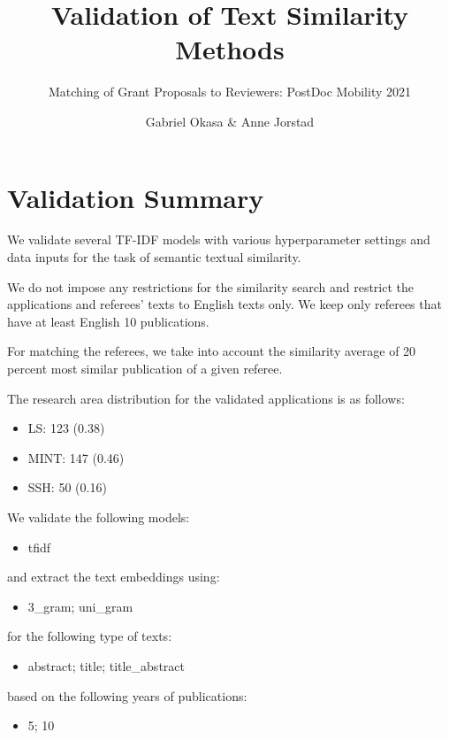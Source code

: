 \documentclass[
]{article}
\title{Validation of Text Similarity Methods}
\subtitle{Matching of Grant Proposals to Reviewers: PostDoc Mobility
2021}
\author{Gabriel Okasa \& Anne Jorstad}
\date{}
\providecommand{\tightlist}{%
  \setlength{\itemsep}{0pt}\setlength{\parskip}{0pt}}
\begin{document}
\maketitle

\hypertarget{validation-summary}{%
\section{Validation Summary}\label{validation-summary}}

We validate several TF-IDF models with various hyperparameter settings
and data inputs for the task of semantic textual similarity.

We do not impose any restrictions for the similarity search and restrict
the applications and referees' texts to English texts only. We keep only
referees that have at least English 10 publications.

For matching the referees, we take into account the similarity average
of 20 percent most similar publication of a given referee.

The research area distribution for the validated applications is as
follows:

\begin{itemize}
\tightlist
\item
  LS: 123 (0.38)
\item
  MINT: 147 (0.46)
\item
  SSH: 50 (0.16)
\end{itemize}

We validate the following models:

\begin{itemize}
\tightlist
\item
  tfidf
\end{itemize}

and extract the text embeddings using:

\begin{itemize}
\tightlist
\item
  3\_gram; uni\_gram
\end{itemize}

for the following type of texts:

\begin{itemize}
\tightlist
\item
  abstract; title; title\_abstract
\end{itemize}

based on the following years of publications:

\begin{itemize}
\tightlist
\item
  5; 10
\end{itemize}
\end{document}
